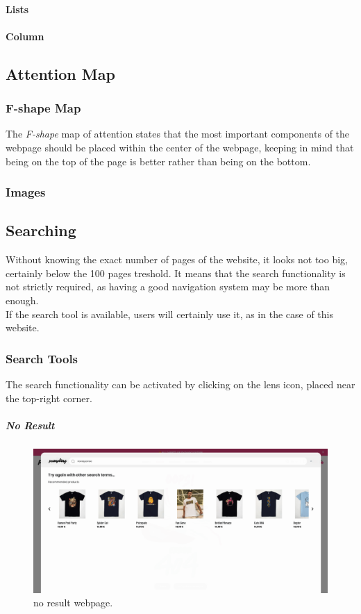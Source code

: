 \paragraph{Lists}

\paragraph{Column}

\subsection{Attention Map}

\subsubsection{F-shape Map}
The \textit{F-shape} map of attention states that the most important components of the webpage should be placed within the center of the webpage, keeping in mind that being on the top of the page is better rather than being on the bottom.\\

\subsubsection{Images}

\subsection{Searching}
Without knowing the exact number of pages of the website, it looks not too big, certainly below the 100 pages treshold. It means that the search functionality is not strictly required, as having a good navigation system may be more than enough.\\
If the search tool is available, users will certainly use it, as in the case of this website.

\subsubsection{Search Tools}
The search functionality can be activated by clicking on the lens icon, placed near the top-right corner.


\subparagraph{No Result}
\begin{figure}[h!]
	\centering
	\includegraphics[scale=0.225]{images/zero-res.png}
	\caption{no result webpage.}
	\label{fig:zero-res}
\end{figure}

